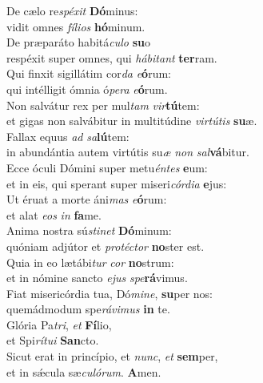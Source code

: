 \evenverse De cælo re\textit{spé}\textit{xit} \textbf{Dó}minus:~\*\\
\evenverse vidit omnes \textit{fí}\textit{li}\textit{os} \textbf{hó}minum.\\
\oddverse De præparáto habitá\textit{cu}\textit{lo} \textbf{su}o~\*\\
\oddverse respéxit super omnes, qui \textit{há}\textit{bi}\textit{tant} \textbf{ter}ram.\\
\evenverse Qui finxit sigillátim cor\textit{da} \textit{e}\textbf{ó}rum:~\*\\
\evenverse qui intélligit ómnia ó\textit{pe}\textit{ra} \textit{e}\textbf{ó}rum.\\
\oddverse Non salvátur rex per mul\textit{tam} \textit{vir}\textbf{tú}tem:~\*\\
\oddverse et gigas non salvábitur in multitúdine \textit{vir}\textit{tú}\textit{tis} \textbf{su}æ.\\
\evenverse Fallax equus \textit{ad} \textit{sa}\textbf{lú}tem:~\*\\
\evenverse in abundántia autem virtútis su\textit{æ} \textit{non} \textit{sal}\textbf{vá}bitur.\\
\oddverse Ecce óculi Dómini super metu\textit{én}\textit{tes} \textbf{e}um:~\*\\
\oddverse et in eis, qui sperant super miseri\textit{cór}\textit{di}\textit{a} \textbf{e}jus:\\
\evenverse Ut éruat a morte áni\textit{mas} \textit{e}\textbf{ó}rum:~\*\\
\evenverse et alat \textit{e}\textit{os} \textit{in} \textbf{fa}me.\\
\oddverse Anima nostra sú\textit{sti}\textit{net} \textbf{Dó}minum:~\*\\
\oddverse quóniam adjútor et \textit{pro}\textit{té}\textit{ctor} \textbf{no}ster est.\\
\evenverse Quia in eo lætábi\textit{tur} \textit{cor} \textbf{no}strum:~\*\\
\evenverse et in nómine sancto \textit{e}\textit{jus} \textit{spe}\textbf{rá}vimus.\\
\oddverse Fiat misericórdia tua, Dó\textit{mi}\textit{ne}, \textbf{su}per nos:~\*\\
\oddverse quemádmodum spe\textit{rá}\textit{vi}\textit{mus} \textbf{in} te.\\
\evenverse Glória Pa\textit{tri}, \textit{et} \textbf{Fí}lio,~\*\\
\evenverse et Spi\textit{rí}\textit{tu}\textit{i} \textbf{San}cto.\\
\oddverse Sicut erat in princípio, et \textit{nunc}, \textit{et} \textbf{sem}per,~\*\\
\oddverse et in sǽcula sæ\textit{cu}\textit{ló}\textit{rum}. \textbf{A}men.\\
